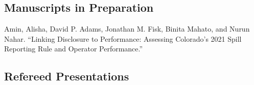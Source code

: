 \documentclass[12pt,letterpaper]{article}
\renewenvironment{itemize}{
  \begin{list}{}{
    \setlength{\leftmargin}{1.5em}
    \setlength{\itemsep}{0.25em}
    \setlength{\parskip}{0pt}
    \setlength{\parsep}{0.25em}
  }
}{
  \end{list}
}
\begin{document}
\subsection*{Manuscripts in Preparation}
  \begin{itemize} \leftmargin=2pt\itemindent=-15pt\leftmargin=2pt\itemindent=-15pt
    
    \item Amin, Alisha, David P. Adams, Jonathan M. Fisk, Binita Mahato, and Nurun Nahar. ``Linking Disclosure to Performance: Assessing Colorado's 2021 Spill Reporting Rule and Operator Performance.''
  \end{itemize}

\subsection*{Refereed Presentations}
\end{document}
